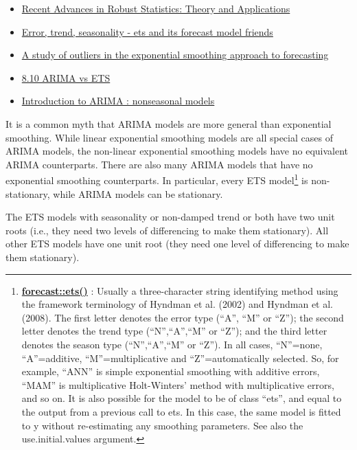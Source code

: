 \documentclass[]{tufte-book}
\providecommand{\tightlist}{%
  \setlength{\itemsep}{0pt}\setlength{\parskip}{0pt}}
\begin{document}
\begin{itemize}
\tightlist
\item
  \href{https://books.google.com.my/books?id=ntR5DQAAQBAJ\&pg=PA174\&lpg=PA174\&dq=exponential+smoothing+mcmc\&source=bl\&ots=QANf4o9oFh\&sig=JWov-64qeFTcOScG2pYj9OVCl2k\&hl=ja\&sa=X\&redir_esc=y\#v=onepage\&q=exponential\%20smoothing\%20mcmc\&f=false}{{Recent
  Advances in Robust Statistics: Theory and Applications}}
\item
  \href{http://ellisp.github.io/blog/2016/11/27/ets-friends}{{Error,
  trend, seasonality - ets and its forecast model friends}}
\item
  \href{https://www.statindex.org/articles/258660}{{A study of outliers
  in the exponential smoothing approach to forecasting}}
\item
  \href{https://www.otexts.org/fpp/8/10}{{8.10 ARIMA vs ETS}}
\item
  \href{http://people.duke.edu/~rnau/411arim.htm\#les}{{Introduction to
  ARIMA : nonseasonal models}}
\end{itemize}

It is a common myth that ARIMA models are more general than exponential
smoothing. While linear exponential smoothing models are all special
cases of ARIMA models, the non-linear exponential smoothing models have
no equivalent ARIMA counterparts. There are also many ARIMA models that
have no exponential smoothing counterparts. In particular, every ETS
model\footnote{\href{https://www.rdocumentation.org/packages/forecast/versions/7.3/topics/ets}{{\textbf{forecast::ets()}}}
  : Usually a three-character string identifying method using the
  framework terminology of Hyndman et al. (2002) and Hyndman et al.
  (2008). The first letter denotes the error type (``A'', ``M'' or
  ``Z''); the second letter denotes the trend type (``N'',``A'',``M'' or
  ``Z''); and the third letter denotes the season type
  (``N'',``A'',``M'' or ``Z''). In all cases, ``N''=none,
  ``A''=additive, ``M''=multiplicative and ``Z''=automatically selected.
  So, for example, ``ANN'' is simple exponential smoothing with additive
  errors, ``MAM'' is multiplicative Holt-Winters' method with
  multiplicative errors, and so on. It is also possible for the model to
  be of class ``ets'', and equal to the output from a previous call to
  ets. In this case, the same model is fitted to y without re-estimating
  any smoothing parameters. See also the use.initial.values argument.}
is non-stationary, while ARIMA models can be stationary.

The ETS models with seasonality or non-damped trend or both have two
unit roots (i.e., they need two levels of differencing to make them
stationary). All other ETS models have one unit root (they need one
level of differencing to make them stationary).
\end{document}
